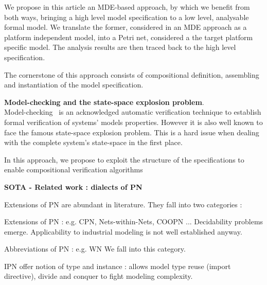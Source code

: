 %
%

We propose in this article an MDE-based approach, by which we
benefit from both ways, bringing a high level model specification to a
low level, analysable formal model. We translate the former, considered
in an MDE approach as a platform independent model, into a Petri net,
considered a the target platform specific model. The analysis results
are then traced back to the high level specification.

The cornerstone of this approach consists of compositional definition,
assembling and instantiation of the model specification.

%
%

\textbf{Model-checking and the state-space explosion problem}.\\
Model-checking~\cite{mc-cmu-01} is an acknowledged automatic 
verification technique to establish formal verification of 
systems' models properties. However it is also well known to face
the famous state-space explosion problem. This is a hard issue
when dealing with the complete system's state-space in the first place.

In this approach, we propose to exploit the structure of 
the specifications to enable compositional verification algorithms~\cite{Voorhoeve:99kx}


\textbf{SOTA - Related work : dialects of PN}

Extensions of PN are abundant in literature. They fall into two categories :

Extensions of PN : e.g. CPN, Nets-within-Nets, COOPN ...
Decidability problems emerge.
Applicability to industrial modeling is not well established anyway.

Abbreviations of PN : e.g. WN
We fall into this category.

IPN offer notion of type and instance : 
allows model type reuse (import directive), divide and conquer to fight modeling complexity.

